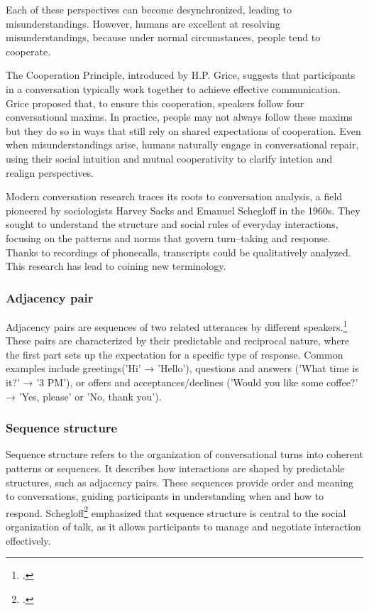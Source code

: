 \documentclass[12pt]{report}
\begin{document}
{        Each of these perspectives can become desynchronized, leading to misunderstandings.
        However, humans are excellent at resolving misunderstandings,
        because under normal circumstances, people tend to cooperate.

\par
The Cooperation Principle, introduced by H.P. Grice,
suggests that participants in a conversation typically work together to achieve effective communication.
Grice proposed that, to ensure this cooperation, speakers follow four conversational maxims.
In practice, people may not always follow these maxims
but they do so in ways that still rely on shared expectations of cooperation.
Even when misunderstandings arise,
humans naturally engage in conversational repair,
using their social intuition and mutual cooperativity to clarify intetion and realign perspectives.

\par
Modern conversation research traces its roots to conversation analysis,
a field pioneered by sociologists Harvey Sacks and Emanuel Schegloff in the 1960s.
They sought to understand the structure and
social rules of everyday interactions,
focusing on the patterns and norms that govern turn–taking and response.
Thanks to recordings of phonecalls,
transcripts could be qualitatively analyzed.
This research has lead to coining new terminology.

    \subsubsection{Adjacency pair}
    \par
    Adjacency pairs are sequences of two related utterances by different speakers.\footcite[p.~188]{Sacks1992}
    These pairs are characterized by their predictable and reciprocal nature, where the first part sets up the expectation for a specific type of response. Common examples include greetings('Hi' → 'Hello'), questions and answers ('What time is it?' → '3 PM'), or offers and acceptances/declines ('Would you like some coffee?' → 'Yes, please' or 'No, thank you').

    \subsubsection{Sequence structure}
    \par
    Sequence structure refers to the organization of conversational turns into coherent patterns or sequences. It describes how interactions are shaped by predictable structures, such as adjacency pairs. These sequences provide order and meaning to conversations, guiding participants in understanding when and how to respond. Schegloff\footcite{Schegloff1990} emphasized that sequence structure is central to the social organization of talk, as it allows participants to manage and negotiate interaction effectively.

}
\end{document}
